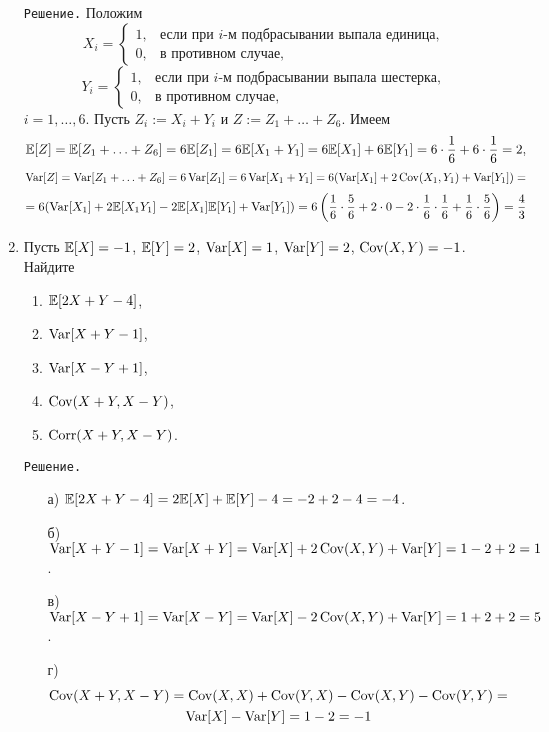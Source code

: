 \begin{enumerate}
\verb"Решение." Положим
\[
X_i =
            \begin{cases}
                            1,     &   \text{если при $i$-м подбрасывании выпала единица,} \\
                            0,     &   \text{в противном случае,}
            \end{cases}
\]
\[
Y_i =
            \begin{cases}
                            1,     &   \text{если при $i$-м подбрасывании выпала шестерка,} \\
                            0,     &   \text{в противном случае,}
            \end{cases}
\]
$i=1, \ldots, 6$. Пусть $Z_i := X_i + Y_i$ и $Z := Z_1 + \ldots + Z_6$. Имеем
\[
\mathbb{E}[Z] = \mathbb{E}[Z_1 + \ldots + Z_6] = 6\mathbb{E}[Z_1] = 6\mathbb{E}[X_1 + Y_1] = 6\mathbb{E}[X_1] + 6\mathbb{E}[Y_1] = 6\cdot\frac{1}{6} + 6\cdot\frac{1}{6} = 2,
\]
\[
\operatorname{Var}[Z] = \operatorname{Var}[Z_1 + \ldots + Z_6] = 6\operatorname{Var}[Z_1] = 6\operatorname{Var}[X_1 + Y_1] = 6(\operatorname{Var}[X_1] + 2\operatorname{Cov}(X_1,Y_1) + \operatorname{Var}[Y_1]) =
\]
\[
 = 6(\operatorname{Var}[X_1] + 2\mathbb{E}[X_1Y_1] - 2\mathbb{E}[X_1]\mathbb{E}[Y_1] + \operatorname{Var}[Y_1]) = 6\left( \frac{1}{6}\cdot\frac{5}{6} + 2\cdot0 - 2\cdot\frac{1}{6}\cdot\frac{1}{6} + \frac{1}{6}\cdot\frac{5}{6} \right) = \frac{4}{3}
\]
\item %
Пусть $\mathbb{E}[X] = -1$, $\mathbb{E}[Y] = 2$, $\operatorname{Var}[X] = 1$, $\operatorname{Var}[Y] = 2$, $\operatorname{Cov}(X,Y) = -1$. Найдите
\begin{enumerate}
  \item $\mathbb{E}[2X+Y-4]$,
  \item $\operatorname{Var}[X+Y-1]$,
  \item $\operatorname{Var}[X-Y+1]$,
  \item $\operatorname{Cov}(X+Y,X-Y)$,
  \item $\operatorname{Corr}(X+Y,X-Y)$.
\end{enumerate}

\verb"Решение."
\begin{enumerate}
\item[а)] $\mathbb{E}[2X+Y-4] = 2\mathbb{E}[X] + \mathbb{E}[Y] - 4 = -2 + 2 - 4 = -4$.

\item[б)] $\operatorname{Var}[X+Y-1] = \operatorname{Var}[X+Y] = \operatorname{Var}[X] + 2\operatorname{Cov}(X,Y) + \operatorname{Var}[Y] = 1 - 2 + 2 = 1$.

\item[в)] $\operatorname{Var}[X-Y+1] = \operatorname{Var}[X-Y] = \operatorname{Var}[X] - 2\operatorname{Cov}(X,Y) + \operatorname{Var}[Y] = 1 + 2 + 2 = 5$.

\item[г)]
\begin{multline*}
\operatorname{Cov}(X+Y, X-Y) = \operatorname{Cov}(X, X) + \operatorname{Cov}(Y, X) - \operatorname{Cov}(X, Y) - \operatorname{Cov}(Y, Y) = \\
 \operatorname{Var}[X] - \operatorname{Var}[Y] = 1 - 2 = -1
\end{multline*}


\end{enumerate}
\end{enumerate}
